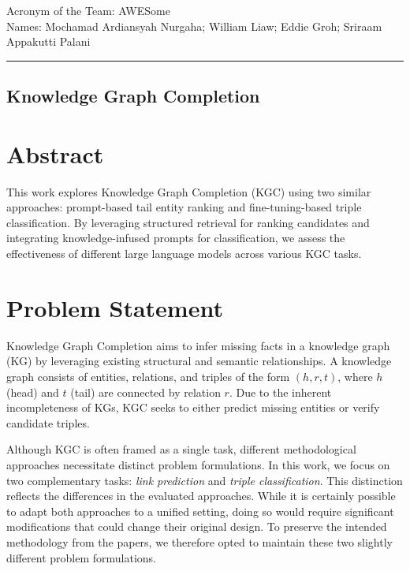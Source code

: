 \documentclass[12pt,a4paper]{article}
\begin{document}
\noindent Acronym of the Team: AWESome\\
Names: Mochamad Ardiansyah Nurgaha; William Liaw; Eddie Groh; Sriraam Appakutti Palani

    {\centering\rule{\linewidth}{.5pt}}

\begin{center}
    \section*{Knowledge Graph Completion}
\end{center}

%
%


\section{Abstract}

This work explores Knowledge Graph Completion (KGC) using two similar approaches: prompt-based tail entity ranking and fine-tuning-based triple classification.
By leveraging structured retrieval for ranking candidates and integrating knowledge-infused prompts for classification, we assess the effectiveness of different large language models across various KGC tasks.

%
%


\section{Problem Statement}\label{sec:problem-statement}

Knowledge Graph Completion aims to infer missing facts in a knowledge graph (KG) by leveraging existing structural and semantic relationships.
A knowledge graph consists of entities, relations, and triples of the form \( (h, r, t) \), where \( h \) (head) and \( t \) (tail) are connected by relation \( r \).
Due to the inherent incompleteness of KGs, KGC seeks to either predict missing entities or verify candidate triples.

Although KGC is often framed as a single task, different methodological approaches necessitate distinct problem formulations.
In this work, we focus on two complementary tasks: \emph{link prediction} and \emph{triple classification}.
This distinction reflects the differences in the evaluated approaches.
While it is certainly possible to adapt both approaches to a unified setting, doing so would require significant modifications that could change their original design.
To preserve the intended methodology from the papers, we therefore opted to maintain these two slightly different problem formulations.
\end{document}

